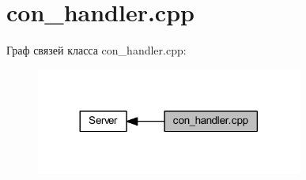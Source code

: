 \hypertarget{group__con__handler__cpp}{}\section{con\+\_\+handler.\+cpp}
\label{group__con__handler__cpp}
Граф связей класса con\+\_\+handler.\+cpp\+:\nopagebreak
\begin{figure}[H]
\begin{center}
\leavevmode
\includegraphics[width=248pt]{group__con__handler__cpp}
\end{center}
\end{figure}
